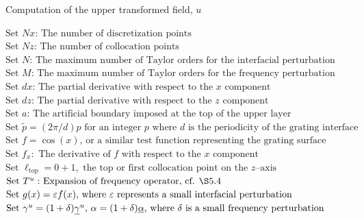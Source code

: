 \begin{algorithm}[H]
\caption{Computation of the upper transformed field, $u$}
\label{alg:transformed_field}
\begin{algorithmic}[1]
\State $\text{Set $Nx$: The number of discretization points}$
\State $\text{Set $Nz$: The number of collocation points}$
\State $\text{Set $N$: The maximum number of Taylor orders for the interfacial perturbation}$
\State $\text{Set $M$: The maximum number of Taylor orders for the frequency perturbation}$
\State $\text{Set $dx$: The partial derivative with respect to the $x$ component}$
\State $\text{Set $dz$: The partial derivative with respect to the $z$ component}$
\State $\text{Set $a$: The artificial boundary imposed at the top of the upper layer}$
\State $\text{Set $\tilde{p}=(2\pi/d)p$ for an integer $p$ where $d$ is the periodicity of the grating interface}$
\State $\text{Set $f=\cos(x)$, or a similar test function representing the grating surface}$
\State $\text{Set $f_x:$ The derivative of $f$ with respect to the $x$ component}$
\State $\text{Set $\ell_{\text{top}}=0+1,$ the top or first collocation point on the $z$--axis}$
\State $\text{Set $T^u:$ Expansion of frequency operator, cf. $\S 5.4$}$
\State $\text{Set $g(x)=\varepsilon f(x),$ where $\varepsilon$ represents a small interfacial perturbation}$
\State $\text{Set $\gamma^u=(1+\delta)\underline{\gamma}^u$, $\alpha = (1+\delta)\underline{\alpha}$,
where $\delta$ is a small frequency perturbation}$
\end{algorithmic}
\end{algorithm}

